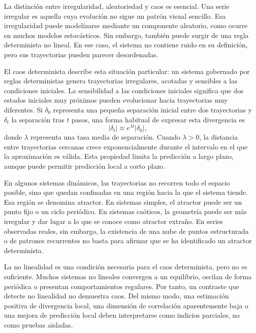 La distinción entre irregularidad, aleatoriedad y caos es esencial. Una serie irregular es aquella cuya evolución no sigue un patrón visual sencillo. Esa irregularidad puede modelizarse mediante un componente aleatorio, como ocurre en muchos modelos estocásticos. Sin embargo, también puede surgir de una regla determinista no lineal. En ese caso, el sistema no contiene ruido en su definición, pero sus trayectorias pueden parecer desordenadas.

El caos determinista describe esta situación particular: un sistema gobernado por reglas deterministas genera trayectorias irregulares, acotadas y sensibles a las condiciones iniciales. La sensibilidad a las condiciones iniciales significa que dos estados iniciales muy próximos pueden evolucionar hacia trayectorias muy diferentes. Si \(\delta_0\) representa una pequeña separación inicial entre dos trayectorias y \(\delta_t\) la separación tras \(t\) pasos, una forma habitual de expresar esta divergencia es
\begin{equation}
    |\delta_t| \approx e^{\lambda t}|\delta_0|,
\end{equation}
donde \(\lambda\) representa una tasa media de separación. Cuando \(\lambda > 0\), la distancia entre trayectorias cercanas crece exponencialmente durante el intervalo en el que la aproximación es válida. Esta propiedad limita la predicción a largo plazo, aunque puede permitir predicción local a corto plazo.

En algunos sistemas dinámicos, las trayectorias no recorren todo el espacio posible, sino que quedan confinadas en una región hacia la que el sistema tiende. Esa región se denomina atractor. En sistemas simples, el atractor puede ser un punto fijo o un ciclo periódico. En sistemas caóticos, la geometría puede ser más irregular y dar lugar a lo que se conoce como atractor extraño. En series observadas reales, sin embargo, la existencia de una nube de puntos estructurada o de patrones recurrentes no basta para afirmar que se ha identificado un atractor determinista.

La no linealidad es una condición necesaria para el caos determinista, pero no es suficiente. Muchos sistemas no lineales convergen a un equilibrio, oscilan de forma periódica o presentan comportamientos regulares. Por tanto, un contraste que detecte no linealidad no demuestra caos. Del mismo modo, una estimación positiva de divergencia local, una dimensión de correlación aparentemente baja o una mejora de predicción local deben interpretarse como indicios parciales, no como pruebas aisladas.

